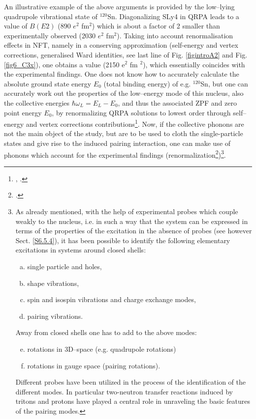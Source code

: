 An illustrative example of the above arguments is provided by the low--lying quadrupole vibrational state of $^{120}$Sn. 
Diagonalizing SLy4 in QRPA leads to a value of $B(E2)$
(890 $e^2$ fm$^2$) which is about a factor of 2 smaller than experimentally observed (2030 $e^2$ fm$^2$). 
Taking into account  renormalisation effects in NFT, 
namely in a conserving  approximation (self-energy and vertex corrections, generalised Ward identities, see last line of Fig. \ref{figintroA2} and  Fig. \ref{fig6_C3x}), one obtains a value (2150 e$^2$ fm $^2$), 
which essentially coincides with 
the experimental findings. One does not know how to accurately calculate the absolute ground state energy 
$E_0$ (total binding energy) of e.g. $^{120}$Sn, but one can accurately work out 
the properties of the low--energy mode of this nucleus, also the collective energies 
$\hbar \omega_L =E_L - E_0$, and thus the associated ZPF and zero point energy $E_0$,
by renormalizing  QRPA solutions to  lowest order through self--energy and vertex corrections contributions\footnote{\cite{Barranco:04}, \cite{Bortignon:81}.}. 
Now, if the collective phonons are not the main object  of the study, but are to be used to cloth the single-particle states 
and give rise to the induced pairing interaction, one can make 
use of phonons which account for the experimental findings (renormalization\footnote{\cite{Idini:15,Broglia:16,Barranco:17}.})\footnote{As already mentioned, with the help of experimental probes which couple weakly to the nucleus,
i.e. in such a way that the system can be expressed in terms of the properties
of the excitation in the absence of probes (see however Sect. \ref{S6.5.4}), it has been possible to identify the
following elementary excitations in systems around closed shells:
\begin{enumerate}[a)]
\item single particle and holes,
\item shape vibrations,
\item spin and isospin vibrations and charge exchange modes,
\item pairing vibrations.
\end{enumerate}
Away from closed shells one has to add to the above modes:
\begin{enumerate}[a)]
\setcounter{enumi}{4}
\item rotations in 3D--space (e.g. quadrupole rotations)
\item rotations in gauge space (pairing rotations).
\end{enumerate}
Different probes have been utilized in the process of the identification of the different modes. In particular two-neutron transfer reactions induced by tritons
and protons have played a central role in unraveling the basic features of the pairing modes.}.





